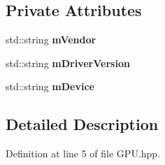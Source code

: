 \subsection*{Private Attributes}
\begin{DoxyCompactItemize}
\item 
std\+::string {\bfseries m\+Vendor}\hypertarget{class_g_p_u_a175c63d0f5ef908a0e20b7fef32746a3}{}\label{class_g_p_u_a175c63d0f5ef908a0e20b7fef32746a3}

\item 
std\+::string {\bfseries m\+Driver\+Version}\hypertarget{class_g_p_u_ac6751bd68c6dca89bd8ef5a4caf88aa6}{}\label{class_g_p_u_ac6751bd68c6dca89bd8ef5a4caf88aa6}

\item 
std\+::string {\bfseries m\+Device}\hypertarget{class_g_p_u_ae090ffd3784da047f027ec0ad804b59e}{}\label{class_g_p_u_ae090ffd3784da047f027ec0ad804b59e}

\end{DoxyCompactItemize}


\subsection{Detailed Description}


Definition at line 5 of file G\+P\+U.\+hpp.

